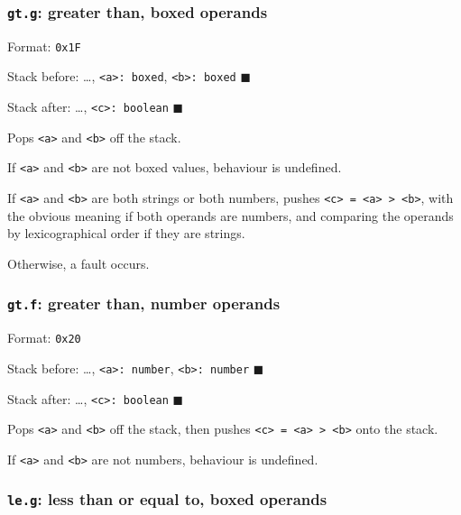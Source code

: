\subsubsection{\texorpdfstring{\texttt{gt.g}: greater than, boxed
operands}{gt.g: greater than, boxed operands}}

Format: \texttt{0x1F}

Stack before: \ldots, \texttt{\textless{}a\textgreater{}:\ boxed},
\texttt{\textless{}b\textgreater{}:\ boxed} \(\blacksquare\)

Stack after: \ldots, \texttt{\textless{}c\textgreater{}:\ boolean}
\(\blacksquare\)

Pops \texttt{\textless{}a\textgreater{}} and
\texttt{\textless{}b\textgreater{}} off the stack.

If \texttt{\textless{}a\textgreater{}} and
\texttt{\textless{}b\textgreater{}} are not boxed values, behaviour is
undefined.

If \texttt{\textless{}a\textgreater{}} and
\texttt{\textless{}b\textgreater{}} are both strings or both numbers,
pushes
\texttt{\textless{}c\textgreater{}\ =\ \textless{}a\textgreater{}\ \textgreater{}\ \textless{}b\textgreater{}},
with the obvious meaning if both operands are numbers, and comparing the
operands by lexicographical order if they are strings.

Otherwise, a fault occurs.

\subsubsection{\texorpdfstring{\texttt{gt.f}: greater than, number
operands}{gt.f: greater than, number operands}}

Format: \texttt{0x20}

Stack before: \ldots, \texttt{\textless{}a\textgreater{}:\ number},
\texttt{\textless{}b\textgreater{}:\ number} \(\blacksquare\)

Stack after: \ldots, \texttt{\textless{}c\textgreater{}:\ boolean}
\(\blacksquare\)

Pops \texttt{\textless{}a\textgreater{}} and
\texttt{\textless{}b\textgreater{}} off the stack, then pushes
\texttt{\textless{}c\textgreater{}\ =\ \textless{}a\textgreater{}\ \textgreater{}\ \textless{}b\textgreater{}}
onto the stack.

If \texttt{\textless{}a\textgreater{}} and
\texttt{\textless{}b\textgreater{}} are not numbers, behaviour is
undefined.

\subsubsection{\texorpdfstring{\texttt{le.g}: less than or equal to,
boxed operands}{le.g: less than or equal to, boxed operands}}

